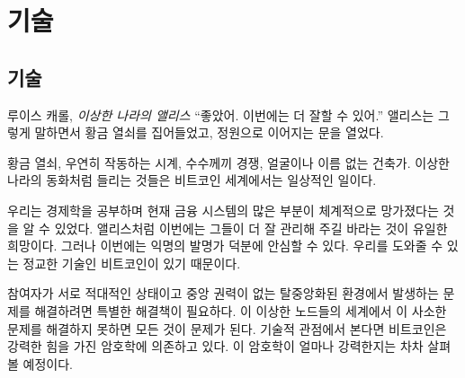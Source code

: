 \part{기술}
\label{ch:technology}
\chapter*{기술}

\begin{comment}
\begin{chapquote}{Lewis Carroll, \textit{Alice in Wonderland}}
\enquote{Now, I'll manage better this time} she said to herself, and began by taking
the little golden key, and unlocking the door that led into the garden
\end{chapquote}
\end{comment}
\begin{chapquote}{루이스 캐롤, \textit{이상한 나라의 앨리스}}
	\enquote{좋았어. 이번에는 더 잘할 수 있어.} 앨리스는 그렇게 말하면서 황금 열쇠를 집어들었고, 
	정원으로 이어지는 문을 열었다.
\end{chapquote}

\begin{comment}
Golden keys, clocks which only work by chance, races to solve
strange riddles, and builders that don't have faces or names. What sounds like
fairy tales from Wonderland is daily business in the world of Bitcoin.
\end{comment}
황금 열쇠, 우연히 작동하는 시계, 수수께끼 경쟁, 얼굴이나 이름 없는 건축가. 이상한 나라의 동화처럼 들리는
것들은 비트코인 세계에서는 일상적인 일이다.

\begin{comment}
As we explored in Chapter~\ref{ch:economics}, large parts of the current financial system are systematically broken. Like Alice, we can only hope to manage better this time. But, thanks to a pseudonymous inventor, we have incredibly sophisticated technology to support us this time around: Bitcoin.
\end{comment}
우리는 경제학을 공부하며 현재 금융 시스템의 많은 부분이 체계적으로 망가졌다는 것을 알 수 있었다.
앨리스처럼 이번에는 그들이 더 잘 관리해 주길 바라는 것이 유일한 희망이다.
그러나 이번에는 익명의 발명가 덕분에 안심할 수 있다.
우리를 도와줄 수 있는 정교한 기술인 비트코인이 있기 때문이다.

\begin{comment}
Solving problems in a radically decentralized and adversarial environment
requires unique solutions. What would otherwise be trivial problems to solve
are everything but in this strange world of nodes. Bitcoin relies on strong
cryptography for most solutions, at least if looked at through the lens of
technology. Just how strong this cryptography is will be explored in one of the
following lessons.
\end{comment}
참여자가 서로 적대적인 상태이고 중앙 권력이 없는 탈중앙화된 환경에서 발생하는 문제를 해결하려면 특별한 해결책이 필요하다.
이 이상한 노드들의 세계에서 이 사소한 문제를 해결하지 못하면 모든 것이 문제가 된다.
기술적 관점에서 본다면 비트코인은 강력한 힘을 가진 암호학에 의존하고 있다. 
이 암호학이 얼마나 강력한지는 차차 살펴볼 예정이다.

